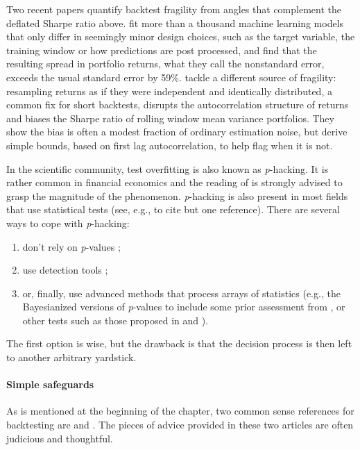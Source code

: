 Two recent papers quantify backtest fragility from angles that complement the deflated Sharpe ratio above. \cite{chen2025design} fit more than a thousand machine learning models that only differ in seemingly minor design choices, such as the target variable, the training window or how predictions are post processed, and find that the resulting spread in portfolio returns, what they call the nonstandard error, exceeds the usual standard error by 59\%. \cite{paskaramoorthy2025bias} tackle a different source of fragility: resampling returns as if they were independent and identically distributed, a common fix for short backtests, disrupts the autocorrelation structure of returns and biases the Sharpe ratio of rolling window mean variance portfolios. They show the bias is often a modest fraction of ordinary estimation noise, but derive simple bounds, based on first lag autocorrelation, to help flag when it is not.

In the scientific community, test overfitting is also known as \textit{p}-hacking. It is rather common in financial economics and the reading of \cite{harvey2017presidential} is strongly advised to grasp the magnitude of the phenomenon. \textit{p}-hacking is also present in most fields that use statistical tests (see, e.g., \cite{head2015extent} to cite but one reference). There are several ways to cope with \textit{p}-hacking:

\begin{enumerate}
\item don't rely on \textit{p}-values \citep{amrhein2019scientists};
\item use detection tools \citep{elliott2019detecting};
\item or, finally, use advanced methods that process arrays of statistics (e.g., the Bayesianized versions of \textit{p}-values to include some prior assessment from \cite{harvey2017presidential}, or other tests such as those proposed in \cite{romano2005stepwise} and \cite{simonsohn2014p}).
\end{enumerate}

The first option is wise, but the drawback is that the decision process is then left to another arbitrary yardstick.

\paragraph{Simple safeguards}

As is mentioned at the beginning of the chapter, two common sense references for backtesting are \cite{fabozzi2018being} and \cite{arnott2019backtesting}. The pieces of advice provided in these two articles are often judicious and thoughtful.

